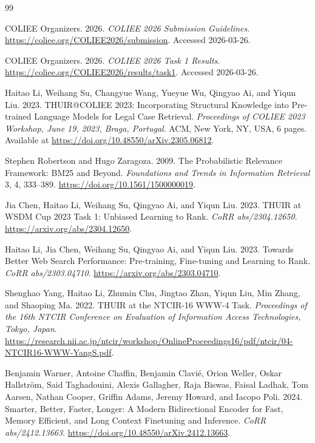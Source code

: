 \begin{thebibliography}{99}
\footnotesize

COLIEE Organizers. 2026.
\emph{COLIEE 2026 Submission Guidelines}.
\url{https://coliee.org/COLIEE2026/submission}.
Accessed 2026-03-26.

COLIEE Organizers. 2026.
\emph{COLIEE 2026 Task 1 Results}.
\url{https://coliee.org/COLIEE2026/results/task1}.
Accessed 2026-03-26.

Haitao Li, Weihang Su, Changyue Wang, Yueyue Wu, Qingyao Ai, and Yiqun Liu.
2023.
THUIR@COLIEE 2023: Incorporating Structural Knowledge into Pre-trained Language
Models for Legal Case Retrieval.
\emph{Proceedings of COLIEE 2023 Workshop, June 19, 2023, Braga, Portugal}.
ACM, New York, NY, USA, 6 pages.
Available at \url{https://doi.org/10.48550/arXiv.2305.06812}.

Stephen Robertson and Hugo Zaragoza. 2009.
The Probabilistic Relevance Framework: BM25 and Beyond.
\emph{Foundations and Trends in Information Retrieval} 3, 4, 333--389.
\url{https://doi.org/10.1561/1500000019}.

Jia Chen, Haitao Li, Weihang Su, Qingyao Ai, and Yiqun Liu. 2023.
THUIR at WSDM Cup 2023 Task 1: Unbiased Learning to Rank.
\emph{CoRR abs/2304.12650}.
\url{https://arxiv.org/abs/2304.12650}.

Haitao Li, Jia Chen, Weihang Su, Qingyao Ai, and Yiqun Liu. 2023.
Towards Better Web Search Performance: Pre-training, Fine-tuning and Learning to Rank.
\emph{CoRR abs/2303.04710}.
\url{https://arxiv.org/abs/2303.04710}.

Shenghao Yang, Haitao Li, Zhumin Chu, Jingtao Zhan, Yiqun Liu, Min Zhang, and Shaoping Ma. 2022.
THUIR at the NTCIR-16 WWW-4 Task.
\emph{Proceedings of the 16th NTCIR Conference on Evaluation of Information Access Technologies, Tokyo, Japan}.
\url{https://research.nii.ac.jp/ntcir/workshop/OnlineProceedings16/pdf/ntcir/04-NTCIR16-WWW-YangS.pdf}.

Benjamin Warner, Antoine Chaffin, Benjamin Clavi{\'e}, Orion Weller,
Oskar Hallstr{\"o}m, Said Taghadouini, Alexis Gallagher, Raja Biswas,
Faisal Ladhak, Tom Aarsen, Nathan Cooper, Griffin Adams, Jeremy Howard,
and Iacopo Poli. 2024.
Smarter, Better, Faster, Longer: A Modern Bidirectional Encoder for Fast,
Memory Efficient, and Long Context Finetuning and Inference.
\emph{CoRR abs/2412.13663}.
\url{https://doi.org/10.48550/arXiv.2412.13663}.


\end{thebibliography}
